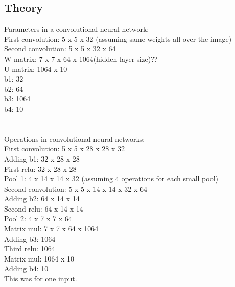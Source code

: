 \documentclass[paper=a4, fontsize=11pt]{scrartcl} %
\numberwithin{equation}{section} %
\numberwithin{figure}{section} %
\numberwithin{table}{section} %
\begin{document}
\subsection{Theory}
Parameters in a convolutional neural network: \\
First convolution: 5 x 5 x 32 (assuming same weights all over the image) \\
Second convolution: 5 x 5 x 32 x 64 \\
W-matrix: 7 x 7 x 64 x 1064(hidden layer size)?? \\
U-matrix: 1064 x 10 \\
b1: 32\\
b2: 64\\
b3: 1064\\
b4: 10\\
\\ \\
Operations in convolutional neural networks: \\
First convolution: 5 x 5 x 28 x 28 x 32 \\
Adding b1: 32 x 28 x 28\\
First relu: 32 x 28 x 28 \\
Pool 1: 4 x 14 x 14 x 32 (assuming 4 operations for each small pool) \\
Second convolution: 5 x 5 x 14 x 14 x 32 x 64 \\
Adding b2: 64 x 14 x 14 \\
Second relu: 64 x 14 x 14 \\
Pool 2: 4 x 7 x 7 x 64 \\
Matrix mul:  7 x 7 x 64 x 1064 \\
Adding b3: 1064 \\
Third relu: 1064 \\
Matrix mul: 1064 x 10 \\
Adding b4: 10 \\
This was for one input. 





\end{document}
